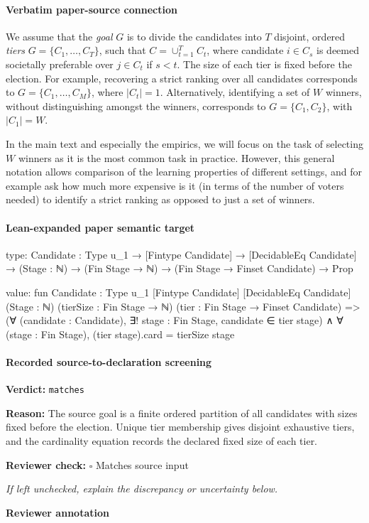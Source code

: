 \documentclass[10pt]{article}
\newcommand{\reviewerbox}{%
  \par\noindent\fbox{\parbox{0.96\linewidth}{\rule{0pt}{0.38in}}}\par
}
\newcommand{\reviewmatch}[1]{%
  \par\noindent\textbf{Reviewer check:} $\square$\; #1\par
  \noindent\emph{If left unchecked, explain the discrepancy or uncertainty below.}\par
}
\begin{document}
\paragraph{Verbatim paper-source connection}
\begin{ReviewVerbatim}
 We assume that the \textit{goal} $G$ is to divide the candidates into $T$  disjoint, ordered \textit{tiers} $G = \{C_1, \dots , C_T\}$, such that $C = \cup_{t=1}^T C_t$, where candidate $i \in C_{s}$ is deemed societally preferable over $j\in C_{t}$ if $s<t$. The size of each tier is fixed before the election. For example, recovering a strict ranking over all candidates corresponds to $G = \{C_1, \dots, C_M\}$, where $|C_t| = 1$. Alternatively, identifying a set of $W$ winners, without distinguishing amongst the winners, corresponds to $G = \{C_1, C_2\}$, with $|C_1| = W$.


In the main text and especially the empirics, we will focus on the task of selecting $W$ winners as it is the most common task in practice. However, this general notation allows comparison of the learning properties of different settings, and for example ask how much more expensive is it (in terms of the number of voters needed) to identify a strict ranking as opposed to just a set of winners.
\end{ReviewVerbatim}



\paragraph{Lean-expanded paper semantic target}
\begin{ReviewVerbatim}
type:
{Candidate : Type u_1} →
  [Fintype Candidate] → [DecidableEq Candidate] → (Stage : ℕ) → (Fin Stage → ℕ) → (Fin Stage → Finset Candidate) → Prop

value:
fun {Candidate : Type u_1} [Fintype Candidate] [DecidableEq Candidate] (Stage : ℕ) (tierSize : Fin Stage → ℕ)
    (tier : Fin Stage → Finset Candidate) =>
  (∀ (candidate : Candidate), ∃! stage : Fin Stage, candidate ∈ tier stage) ∧
    ∀ (stage : Fin Stage), (tier stage).card = tierSize stage
\end{ReviewVerbatim}


\paragraph{Recorded source-to-declaration screening}
\textbf{Verdict:} \texttt{matches}
\\
{\raggedright
\textbf{Reason:} The source goal is a finite ordered partition of all candidates with sizes fixed before the election.\allowbreak{} Unique tier membership gives disjoint exhaustive tiers, and the cardinality equation records the declared fixed size of each tier.\allowbreak{}
\par}
\reviewmatch{Matches source input}
\noindent\textbf{Reviewer annotation}\par
\reviewerbox
\clearpage
\hypertarget{paper-prerequisite-9cdfd167c7e65bdc}{}
\end{document}
